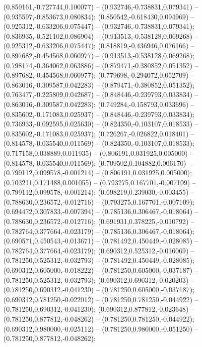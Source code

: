  (0.859161,-0.727744,0.100077) -- (0.932746,-0.738831,0.079341) -- (0.935597,-0.853673,0.080834);
 (0.850542,-0.618430,0.094969) -- (0.925312,-0.633206,0.075447) -- (0.932746,-0.738831,0.079341);
 (0.836935,-0.521102,0.086904) -- (0.913513,-0.538128,0.069268) -- (0.925312,-0.633206,0.075447);
 (0.818819,-0.436946,0.076166) -- (0.897682,-0.454568,0.060977) -- (0.913513,-0.538128,0.069268);
 (0.798174,-0.364062,0.063886) -- (0.879471,-0.380852,0.051352) -- (0.897682,-0.454568,0.060977);
 (0.779698,-0.294072,0.052709) -- (0.863016,-0.309587,0.042283) -- (0.879471,-0.380852,0.051352);
 (0.763477,-0.225809,0.042687) -- (0.848446,-0.239793,0.033834) -- (0.863016,-0.309587,0.042283);
 (0.749284,-0.158793,0.033696) -- (0.835602,-0.171083,0.025937) -- (0.848446,-0.239793,0.033834);
 (0.736933,-0.092595,0.025630) -- (0.824350,-0.103107,0.018533) -- (0.835602,-0.171083,0.025937);
 (0.726267,-0.026822,0.018401) -- (0.814578,-0.035540,0.011569) -- (0.824350,-0.103107,0.018533);
 (0.717158,0.038889,0.011935) -- (0.806191,0.031925,0.005000) -- (0.814578,-0.035540,0.011569);
 (0.709502,0.104882,0.006170) -- (0.799112,0.099578,-0.001214) -- (0.806191,0.031925,0.005000);
 (0.703211,0.171488,0.001055) -- (0.793275,0.167701,-0.007109) -- (0.799112,0.099578,-0.001214);
 (0.698219,0.239030,-0.003455) -- (0.788630,0.236572,-0.012716) -- (0.793275,0.167701,-0.007109);
 (0.694472,0.307833,-0.007394) -- (0.785136,0.306467,-0.018064) -- (0.788630,0.236572,-0.012716);
 (0.691931,0.378225,-0.010792) -- (0.782764,0.377664,-0.023179) -- (0.785136,0.306467,-0.018064);
 (0.690571,0.450543,-0.013671) -- (0.781492,0.450449,-0.028085) -- (0.782764,0.377664,-0.023179);
 (0.690312,0.525312,-0.016069) -- (0.781250,0.525312,-0.032793) -- (0.781492,0.450449,-0.028085);
 (0.690312,0.605000,-0.018222) -- (0.781250,0.605000,-0.037187) -- (0.781250,0.525312,-0.032793);
 (0.690312,0.690312,-0.020203) -- (0.781250,0.690312,-0.041230) -- (0.781250,0.605000,-0.037187);
 (0.690312,0.781250,-0.022012) -- (0.781250,0.781250,-0.044922) -- (0.781250,0.690312,-0.041230);
 (0.690312,0.877812,-0.023648) -- (0.781250,0.877812,-0.048262) -- (0.781250,0.781250,-0.044922);
 (0.690312,0.980000,-0.025112) -- (0.781250,0.980000,-0.051250) -- (0.781250,0.877812,-0.048262);
